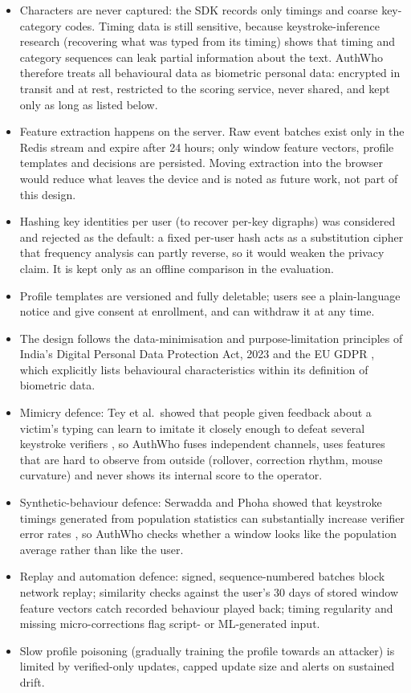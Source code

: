 \documentclass[10pt,letterpaper]{article}
\begin{document}
\begin{itemize}
  \item Characters are never captured: the SDK records only timings and coarse key-category codes. Timing data is still sensitive, because keystroke-inference research (recovering what was typed from its timing) shows that timing and category sequences can leak partial information about the text. AuthWho therefore treats all behavioural data as biometric personal data: encrypted in transit and at rest, restricted to the scoring service, never shared, and kept only as long as listed below.
  \item Feature extraction happens on the server. Raw event batches exist only in the Redis stream and expire after 24 hours; only window feature vectors, profile templates and decisions are persisted. Moving extraction into the browser would reduce what leaves the device and is noted as future work, not part of this design.
  \item Hashing key identities per user (to recover per-key digraphs) was considered and rejected as the default: a fixed per-user hash acts as a substitution cipher that frequency analysis can partly reverse, so it would weaken the privacy claim. It is kept only as an offline comparison in the evaluation.
  \item Profile templates are versioned and fully deletable; users see a plain-language notice and give consent at enrollment, and can withdraw it at any time.
  \item The design follows the data-minimisation and purpose-limitation principles of India's Digital Personal Data Protection Act, 2023 \cite{dpdp2023} and the EU GDPR \cite{gdpr2016}, which explicitly lists behavioural characteristics within its definition of biometric data.
  \item Mimicry defence: Tey et al.\ showed that people given feedback about a victim's typing can learn to imitate it closely enough to defeat several keystroke verifiers \cite{tey2013}, so AuthWho fuses independent channels, uses features that are hard to observe from outside (rollover, correction rhythm, mouse curvature) and never shows its internal score to the operator.
  \item Synthetic-behaviour defence: Serwadda and Phoha showed that keystroke timings generated from population statistics can substantially increase verifier error rates \cite{serwadda2013}, so AuthWho checks whether a window looks like the population average rather than like the user.
  \item Replay and automation defence: signed, sequence-numbered batches block network replay; similarity checks against the user's 30 days of stored window feature vectors catch recorded behaviour played back; timing regularity and missing micro-corrections flag script- or ML-generated input.
  \item Slow profile poisoning (gradually training the profile towards an attacker) is limited by verified-only updates, capped update size and alerts on sustained drift.
\end{itemize}
\end{document}
